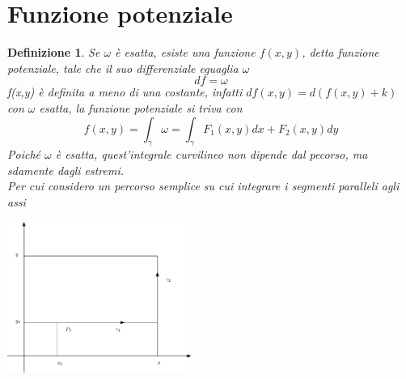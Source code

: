 \documentclass{book}
\newtheorem{defi}{Definizione}
\begin{document}
\section{Funzione potenziale}
\begin{defi}
	Se $\omega$ è esatta, esiste una funzione $f(x,y)$, detta
	{\color{red}funzione potenziale}, tale che il suo differenziale eguaglia
	$\omega$
	\begin{equation*}
		df=\omega
	\end{equation*}
	f(x,y) è definita a meno di una costante, infatti $df(x,y)= d(f(x,y)+k)$
	con $\omega$ esatta, la funzione potenziale si triva con 
	\begin{equation*}
		f(x,y)=\int_\gamma \omega=\int_\gamma F_1(x,y)dx+F_2(x,y)dy
	\end{equation*}
	Poiché $\omega$ è esatta, quest'integrale curvilineo non dipende dal
	pecorso, ma sdamente dagli estremi. \\
	Per cui considero un percorso semplice su cui integrare i segmenti
	paralleli agli assi
	\begin{multicols}{2}
		\includegraphics[width=6cm]{img/finiti/es-fun-pot.eps}
	\end{multicols}

\end{defi}
\printindex
\end{document}
